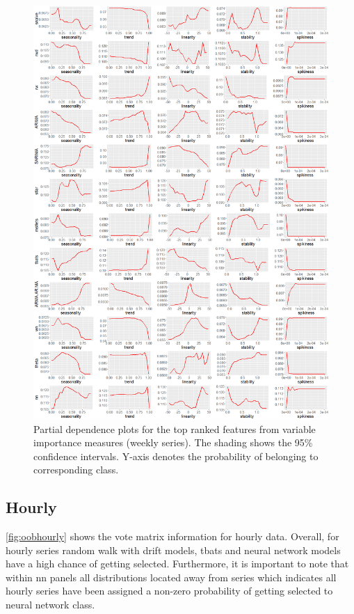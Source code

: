 \documentclass[11pt,a4paper,]{article}
\begin{document}
\begin{figure}
\centering
\includegraphics{figures/weeklypdp-1.png}
\caption{\label{fig:weeklypdp}Partial dependence plots for the top ranked
features from variable importance measures (weekly series). The shading
shows the 95\% confidence intervals. Y-axis denotes the probability of
belonging to corresponding class.}
\end{figure}

\subsection{Hourly}\label{hourly}

\autoref{fig:oobhourly} shows the vote matrix information for hourly
data. Overall, for hourly series random walk with drift models, tbats
and neural network models have a high chance of getting selected.
Furthermore, it is important to note that within nn panels all
distributions located away from series which indicates all hourly series
have been assigned a non-zero probability of getting selected to neural
network class.
\end{document}
